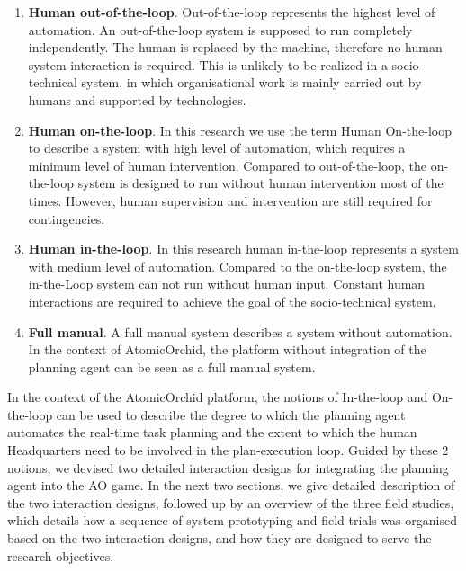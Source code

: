 \begin{enumerate}
\item \textbf{Human out-of-the-loop}.
Out-of-the-loop represents the highest level of automation. An out-of-the-loop system is supposed to run completely independently. The human is replaced by the machine, therefore no human system interaction is required. This is unlikely to be realized in a socio-technical system, in which organisational work is mainly carried out by humans and supported by technologies.  \\

\item \textbf{Human on-the-loop}.
In this research we use the term Human On-the-loop to describe a system with high level of automation, which requires a minimum level of human intervention. Compared to out-of-the-loop, the on-the-loop system is designed to run without human intervention most of the times. However, human supervision and intervention are still required for contingencies. 

\item \textbf{Human in-the-loop}.
In this research human in-the-loop represents a system with medium level of automation. Compared to the on-the-loop system, the in-the-Loop system can not run without human input. Constant human interactions are required to achieve the goal of the socio-technical system. \\

\item \textbf{Full manual}.
A full manual system describes a system without automation. In the context of AtomicOrchid, the platform without integration of the planning agent can be seen as a full manual system. 

\end{enumerate}

In the context of the AtomicOrchid platform, the notions of In-the-loop and On-the-loop can be used to describe the degree to which the planning agent automates the real-time task planning and the extent to which the human Headquarters need to be involved in the plan-execution loop. Guided by these 2 notions, we devised two detailed interaction designs for integrating the planning agent into the \ac{AO} game. In the next two sections, we give detailed description of the two interaction designs, followed up by an overview of the three field studies, which details how a sequence of system prototyping  and field trials was organised based on the two interaction designs, and how they are designed to serve the research objectives.\\

